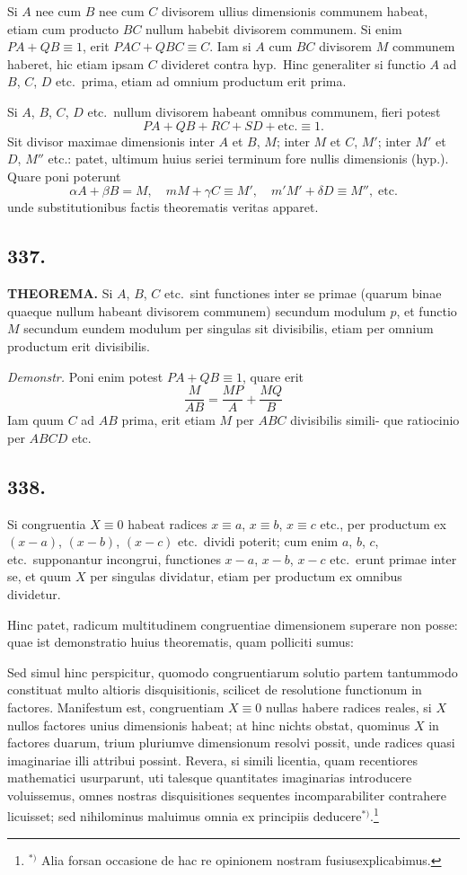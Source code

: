 \documentclass[12pt,a4paper]{article}
\begin{document}
Si $A$ nee cum $B$ nee cum $C$ divisorem ullius dimensionis communem habeat, etiam cum producto $BC$ nullum habebit divisorem communem. Si enim $PA+QB\equiv 1$, erit $PAC+QBC\equiv C$. Iam si $A$ cum $BC$ divisorem $M$ communem haberet, hic etiam ipsam $C$ divideret contra hyp.~Hinc generaliter si functio $A$ ad $B$, $C$, $D$ etc.~prima, etiam ad omnium productum erit prima.

Si $A$, $B$, $C$, $D$ etc.~nullum divisorem habeant omnibus communem, fieri potest
\[
PA + QB + RC + SD + \text{etc.} \equiv 1.
\]
Sit divisor maximae dimensionis inter $A$ et $B$, $M$; inter $M$ et $C$, $M'$; inter $M'$ et $D$, $M''$ etc.: patet, ultimum huius seriei terminum fore nullis dimensionis (hyp.). Quare poni poterunt
\[
\alpha A + \beta B = M,\quad mM + \gamma C \equiv M',\quad m'M' + \delta D \equiv M'',\; \text{etc.}
\]
unde substitutionibus factis theorematis veritas apparet.

\subsection*{337.}

\textbf{THEOREMA.} Si $A$, $B$, $C$ etc.~sint functiones inter se primae (quarum binae quaeque nullum habeant divisorem communem) secundum modulum $p$, et functio $M$ secundum eundem modulum per singulas sit divisibilis, etiam per omnium productum erit divisibilis.

\textit{Demonstr.} Poni enim potest $PA+QB\equiv 1$, quare erit
\[
\frac{M}{AB} = \frac{MP}{A} + \frac{MQ}{B}
\]
Iam quum $C$ ad $AB$ prima, erit etiam $M$ per $ABC$ divisibilis simili- que ratiocinio per $ABCD$ etc.

\subsection*{338.}

Si congruentia $X\equiv 0$ habeat radices $x\equiv a$, $x\equiv b$, $x\equiv c$ etc., per productum ex $(x-a)$, $(x-b)$, $(x-c)$ etc.~dividi poterit; cum enim $a$, $b$, $c$, etc.~supponantur incongrui, functiones $x-a$, $x-b$, $x-c$ etc.~erunt primae inter se, et quum $X$ per singulas dividatur, etiam per productum ex omnibus dividetur.

Hinc patet, radicum multitudinem congruentiae dimensionem superare non posse: quae ist demonstratio huius theorematis, quam polliciti sumus:

Sed simul hinc perspicitur, quomodo congruentiarum solutio partem tantummodo constituat multo altioris disquisitionis, scilicet de resolutione functionum in factores. Manifestum est, congruentiam $X\equiv 0$ nullas habere radices reales, si $X$ nullos factores unius dimensionis habeat; at hinc nichts obstat, quominus $X$ in factores duarum, trium pluriumve dimensionum resolvi possit, unde radices quasi imaginariae illi attribui possint. Revera, si simili licentia, quam recentiores mathematici usurparunt, uti talesque quantitates imaginarias introducere voluissemus, omnes nostras disquisitiones sequentes incomparabiliter contrahere licuisset; sed nihilominus maluimus omnia ex principiis deducere$^{*)}$.\footnote{$^{*)}$ Alia forsan occasione de hac re opinionem nostram fusiusexplicabimus.}
\end{document}
